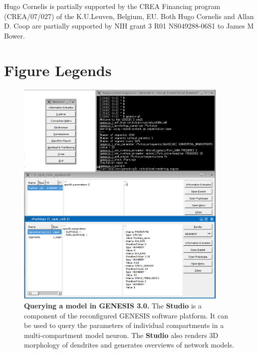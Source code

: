 \documentclass[10pt]{article}
\begin{document}
Hugo Cornelis is partially supported by the CREA Financing program (CREA/07/027) of the K.U.Leuven, Belgium, EU. Both Hugo Cornelis and Allan D. Coop are partially supported by NIH grant 3 R01 NS049288-06S1 to James M Bower.



\newpage

\section*{Figure Legends}

\begin{figure}[ht]
\begin{center}
\includegraphics[width=4in]{figures/studio-screenshot.eps}
\end{center}
\caption{
{\bf Querying a model in GENESIS 3.0.} The {\bf Studio} is a component of the reconfigured GENESIS software platform. It can be used to query the parameters of individual compartments in a multi-compartment model neuron. The {\bf Studio} also renders 3D morphology of dendrites and generates overviews of network models.
}
\label{fig:cbi-studio}
\end{figure}
\end{document}
